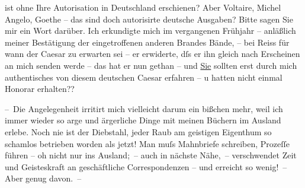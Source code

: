                ist ohne Ihre Autorisation in Deutschland
               erschienen? Aber Voltaire, Michel Angelo, Goethe – das
               sind doch autorisirte deutsche Ausgaben? Bitte sagen Sie mir ein Wort darüber. Ich
               erkundigte mich im vergangenen Frühjahr – anläßlich meiner Bestätigung der
               eingetroffenen anderen Brandes Bände, – \introOben{}bei Reiss\introOben{} für wann der Caesar zu erwarten sei – er
               erwiderte, dſs er ihn gleich nach Erscheinen an mich senden werde – das hat er {\pb}nun gethan – und \uline{Sie} sollten erst durch mich authentisches von diesem deutschen Caesar erfahren – u hatten nicht einmal Honorar
               erhalten??\pend
           
\pstart
           – Die Angelegenheit irritirt mich vielleicht darum ein bißchen mehr, weil ich immer
               wieder so arge und ärgerliche Dinge mit meinen Büchern im Ausland erlebe. Noch nie
               ist der Diebstahl, jeder Raub am geistigen Eigenthum so schamlos betrieben worden als
               jetzt! Man muſs Mahnbriefe schreiben, Prozeſſe führen – oh nicht nur ins Ausland; –
               auch in nächste Nähe, – verschwendet Zeit und Geisteskraft an geschäftliche
               Correspondenzen – und erreicht so wenig! – Aber genug davon. –\pend
           
